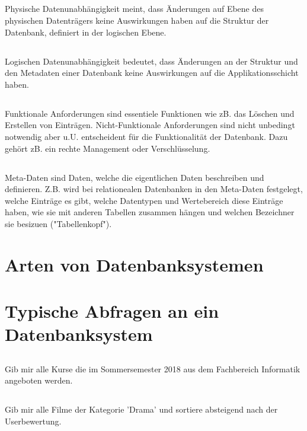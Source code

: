 \subsection{}
Physische Datenunabhängigkeit meint, dass Änderungen auf Ebene des physischen Datenträgers keine Auswirkungen haben auf die Struktur der Datenbank, definiert in der logischen Ebene.

\subsection{}
Logischen Datenunabhängigkeit bedeutet, dass Änderungen an der Struktur und den Metadaten einer Datenbank keine Auswirkungen auf die Applikationsschicht haben.

\subsection{}
Funktionale Anforderungen sind essentiele Funktionen wie zB. das Löschen und Erstellen von Einträgen. Nicht-Funktionale Anforderungen sind nicht unbedingt notwendig aber u.U. entscheident für die Funktionalität der Datenbank. Dazu gehört zB. ein rechte Management oder Verschlüsselung. 

\subsection{}
Meta-Daten sind Daten, welche die eigentlichen Daten beschreiben und definieren. Z.B. wird bei relationealen Datenbanken in den Meta-Daten festgelegt, welche Einträge es gibt, welche Datentypen und Wertebereich diese Einträge haben, wie sie mit anderen Tabellen zusammen hängen und welchen Bezeichner sie besizuen ("Tabellenkopf").

\section{Arten von Datenbanksystemen}


\section{Typische Abfragen an ein Datenbanksystem}
\subsection{}
Gib mir alle Kurse die im Sommersemester 2018 aus dem Fachbereich Informatik angeboten werden.

\subsection{}
Gib mir alle Filme der Kategorie 'Drama' und sortiere absteigend nach der Userbewertung.

